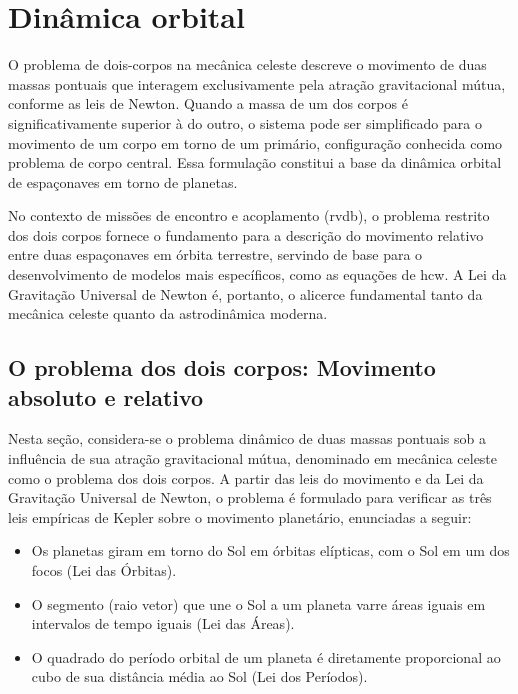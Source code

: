 \section{Dinâmica orbital}
\label{sec_dinamica_orbital}

O problema de dois-corpos na mecânica celeste descreve o movimento de duas massas pontuais que interagem exclusivamente pela atração gravitacional mútua, conforme as leis de Newton.
Quando a massa de um dos corpos é significativamente superior à do outro, o sistema pode ser simplificado para o movimento de um corpo em torno de um primário, configuração conhecida como problema de corpo central.
Essa formulação constitui a base da dinâmica orbital de espaçonaves em torno de planetas.

No contexto de missões de encontro e acoplamento (\gls{rvdb}), o problema restrito dos dois corpos fornece o fundamento para a descrição do movimento relativo entre duas espaçonaves em órbita terrestre, servindo de base para o desenvolvimento de modelos mais específicos, como as equações de \gls{hcw}.
A Lei da Gravitação Universal de Newton é, portanto, o alicerce fundamental tanto da mecânica celeste quanto da astrodinâmica moderna.


\subsection{O problema dos dois corpos: Movimento absoluto e relativo}
\label{sec_doiscorpos}

Nesta seção, considera-se o problema dinâmico de duas massas pontuais sob a influência de sua atração gravitacional mútua, denominado em mecânica celeste como o problema dos dois corpos. A partir das leis do movimento e da Lei da Gravitação Universal de Newton, o problema é formulado para verificar as três leis empíricas de Kepler \cite{vallado2007fundamentals} sobre o movimento planetário, enunciadas a seguir:

\begin{itemize}
    \item Os planetas giram em torno do Sol em órbitas elípticas, com o Sol em um dos focos (Lei das Órbitas).
    \item O segmento (raio vetor) que une o Sol a um planeta varre áreas iguais em intervalos de tempo iguais (Lei das Áreas).
    \item O quadrado do período orbital de um planeta é diretamente proporcional ao cubo
de sua distância média ao Sol (Lei dos Períodos)\cite{SaraivaKeplerAula}.
\end{itemize}


